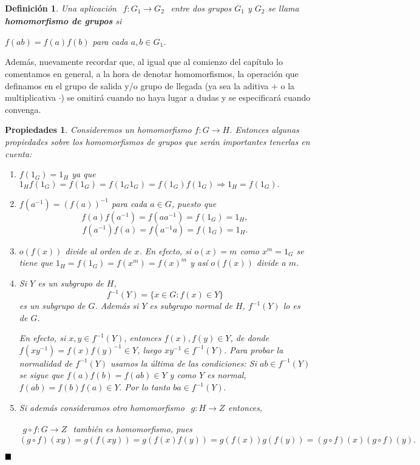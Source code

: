 \documentclass[12pt]{article}
\newtheorem{definition}[theorem]{Definición}
\newtheorem{properties}{Propiedades}[theorem]
\begin{document}
\begin{definition}Una aplicación $
\begin{array}{rccl}
f\colon G_{1} \longrightarrow  G_{2}
\end{array}
$ entre dos grupos $G_{1}$ y $G_{2}$ se llama \textbf{homomorfismo de grupos} si
\begin{center}
$f(ab) = f(a)f(b)$ para cada $a,b \in G_{1}$.
\end{center}
\end{definition}

Además, nuevamente recordar que, al igual que al comienzo del capítulo lo comentamos en general, a la hora de denotar homomorfismos, la operación que definamos en el grupo de salida y/o grupo de llegada (ya sea la aditiva $+$ o la multiplicativa $\cdot$) se omitirá cuando no haya lugar a dudas y se especificará cuando convenga.

\begin{properties}Consideremos un homomorfismo $f \colon G \longrightarrow H$. Entonces algunas propiedades sobre los homomorfismos de grupos que serán importantes tenerlas en cuenta:
\begin{enumerate}
\item $f(1_{G}) = 1_{H}$ ya que $1_{H}f(1_{G}) = f(1_{G}) = f(1_{G}1_{G}) = f(1_{G})f(1_{G}) \Longrightarrow 1_{H} = f(1_{G}).$
\item $f(a^{-1}) = (f(a))^{-1}$ para cada $a \in G$, puesto que $$f(a)f(a^{-1}) = f(aa^{-1}) = f(1_{G}) = 1_{H},$$ $$f(a^{-1})f(a) = f(a^{-1}a) = f(1_{G}) = 1_{H}.$$
\item $o(f(x))$ divide al orden de $x$. En efecto, si $o(x) = m$ como $x^{m} = 1_{G}$ se tiene que $1_{H} = f(1_{G}) = f(x^{m}) = f(x)^{m}$ y así $o(f(x))$ divide a $m$. 
\item Si $Y$ es un subgrupo de $H$, $$f^{-1}(Y) = \lbrace x \in G : f(x) \in Y\rbrace$$ es un subgrupo de $G$. Además si $Y$ es subgrupo normal de $H$, $f^{-1}(Y)$ lo es de $G$.

En efecto, si $x,y \in f^{-1}(Y)$, entonces $f(x),f(y) \in Y$, de donde $f(xy^{-1}) = f(x)f(y)^{-1} \in Y$, luego $xy^{-1} \in f^{-1}(Y)$. Para probar la normalidad de $f^{-1}(Y)$ usamos la última de las condiciones: Si $ab \in f^{-1}(Y)$ se sigue que $f(a)f(b) = f(ab) \in Y$ y como $Y$ es normal, $f(ab) = f(b)f(a) \in Y.$ Por lo tanto $ba \in f^{-1}(Y).$
 
\item Si además consideramos otro homomorfismo $
\begin{array}{rccl}
g\colon H \longrightarrow  Z
\end{array}
$entonces,

$\begin{array}{rccl}
g \circ f\colon G \longrightarrow  Z
\end{array}
$ también es homomorfismo, pues $$ (g \circ f)(xy) = g(f(xy)) = g(f(x)f(y)) = g(f(x))g(f(y)) = (g \circ f)(x) (g \circ f)(y).$$
\end{enumerate}
\end{properties}
$\hfill \blacksquare$
\end{document}
